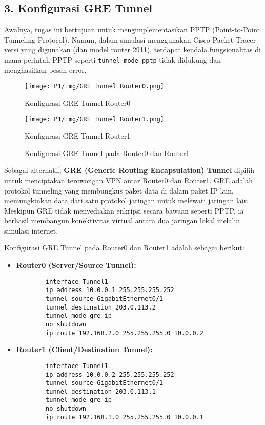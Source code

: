 \subsection*{3. Konfigurasi GRE Tunnel}
Awalnya, tugas ini bertujuan untuk mengimplementasikan PPTP (Point-to-Point Tunneling Protocol). Namun, dalam simulasi menggunakan Cisco Packet Tracer versi yang digunakan (dan model router 2911), terdapat kendala fungsionalitas di mana perintah PPTP seperti \texttt{tunnel mode pptp} tidak didukung dan menghasilkan pesan error.

\begin{figure}[h!]
    \centering
    \begin{minipage}[t]{0.48\textwidth}
        \centering
        \texttt{[image: P1/img/GRE Tunnel Router0.png]} 
        \caption{Konfigurasi GRE Tunnel Router0}
        \label{fig:gre_router0}
    \end{minipage}
    \hfill
    \begin{minipage}[t]{0.48\textwidth}
        \centering
        \texttt{[image: P1/img/GRE Tunnel Router1.png]} 
        \caption{Konfigurasi GRE Tunnel Router1}
        \label{fig:gre_router1}
    \end{minipage}
    \caption{Konfigurasi GRE Tunnel pada Router0 dan Router1}
\end{figure}

Sebagai alternatif, \textbf{GRE (Generic Routing Encapsulation) Tunnel} dipilih untuk menciptakan terowongan VPN antar Router0 dan Router1. GRE adalah protokol tunneling yang membungkus paket data di dalam paket IP lain, memungkinkan data dari satu protokol jaringan untuk melewati jaringan lain. Meskipun GRE tidak menyediakan enkripsi secara bawaan seperti PPTP, ia berhasil membangun konektivitas virtual antara dua jaringan lokal melalui simulasi internet.

Konfigurasi GRE Tunnel pada Router0 dan Router1 adalah sebagai berikut:
\begin{itemize}
    \item \textbf{Router0 (Server/Source Tunnel):}
    \begin{verbatim}
        interface Tunnel1
        ip address 10.0.0.1 255.255.255.252
        tunnel source GigabitEthernet0/1
        tunnel destination 203.0.113.2
        tunnel mode gre ip
        no shutdown
        ip route 192.168.2.0 255.255.255.0 10.0.0.2
    \end{verbatim}
    \item \textbf{Router1 (Client/Destination Tunnel):}
    \begin{verbatim}
        interface Tunnel1
        ip address 10.0.0.2 255.255.255.252
        tunnel source GigabitEthernet0/1
        tunnel destination 203.0.113.1
        tunnel mode gre ip
        no shutdown
        ip route 192.168.1.0 255.255.255.0 10.0.0.1
    \end{verbatim}
\end{itemize}

